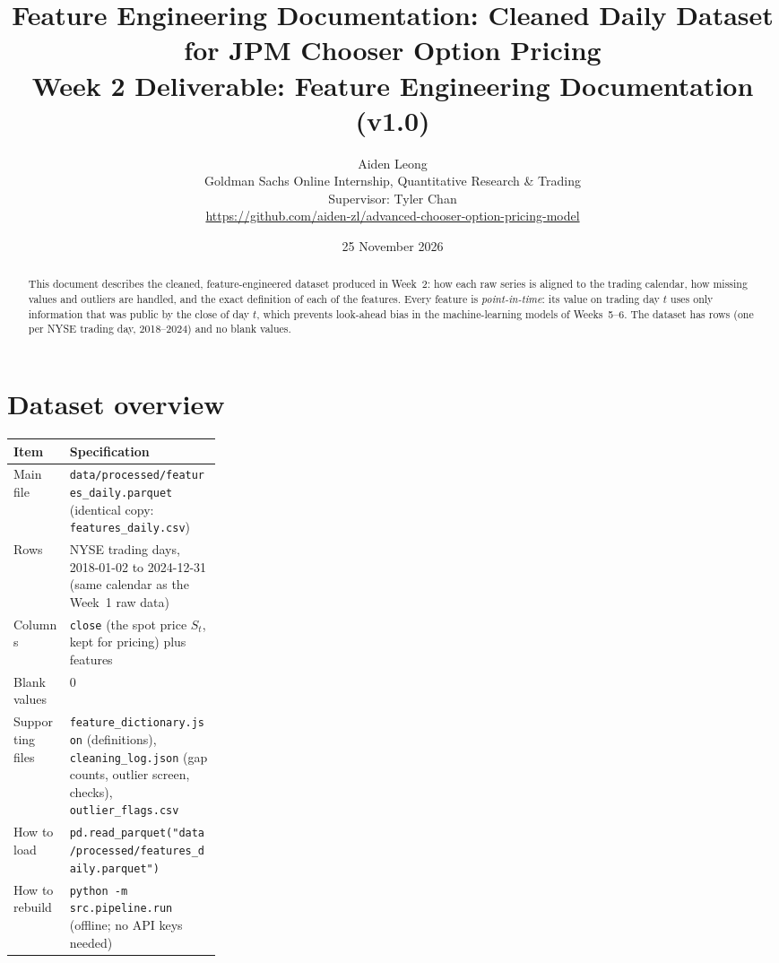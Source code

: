 \documentclass[11pt]{article}
\title{\textbf{Feature Engineering Documentation: Cleaned Daily Dataset for JPM Chooser Option Pricing}\\[4pt]
\large Week 2 Deliverable: Feature Engineering Documentation (v1.0)}
\author{Aiden Leong\\[2pt]
\small Goldman Sachs Online Internship, Quantitative Research \& Trading\\
\small Supervisor: Tyler Chan\\
\small \url{https://github.com/aiden-zl/advanced-chooser-option-pricing-model}}
\date{25 November 2026}
\newcommand{\code}[1]{\texttt{#1}}
\begin{document}
\maketitle

\begin{abstract}
\noindent
This document describes the cleaned, feature-engineered dataset produced in Week~2: how each raw series is aligned to
the trading calendar, how missing values and outliers are handled, and the exact definition of each of the
\wFeatures{} features. Every feature is \emph{point-in-time}: its value on trading day $t$ uses only information that
was public by the close of day $t$, which prevents look-ahead bias in the machine-learning models of Weeks~5--6. The
dataset has \wRows{} rows (one per NYSE trading day, 2018--2024) and no blank values.
\end{abstract}

\section{Dataset overview}
\begin{table}[H]
\centering\small
\begin{tabularx}{\linewidth}{@{}>{\raggedright\arraybackslash}p{0.27\linewidth}L@{}}
\toprule
Item & Specification \\
\midrule
Main file & \code{data/processed/features\_daily.parquet} (identical copy: \code{features\_daily.csv}) \\
Rows & \wRows{} NYSE trading days, 2018-01-02 to 2024-12-31 (same calendar as the Week~1 raw data) \\
Columns & \code{close} (the spot price $S_t$, kept for pricing) plus \wFeatures{} features \\
Blank values & 0 \\
Supporting files & \code{feature\_dictionary.json} (definitions), \code{cleaning\_log.json} (gap counts, outlier screen, checks), \code{outlier\_flags.csv} \\
How to load & \code{pd.read\_parquet("data/processed/features\_daily.parquet")} \\
How to rebuild & \code{python -m src.pipeline.run} (offline; no API keys needed) \\
\bottomrule
\end{tabularx}
\end{table}

\end{document}
